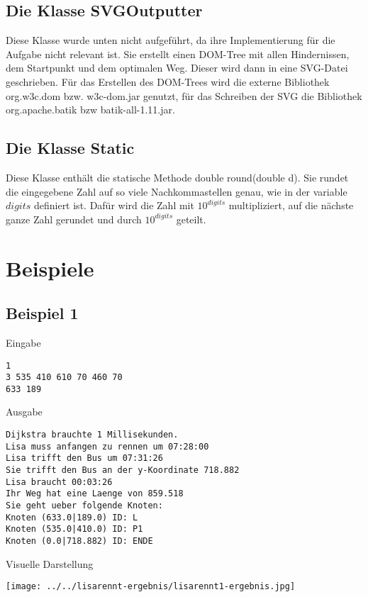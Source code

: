 \documentclass[a4paper,10pt,ngerman]{scrartcl}
\begin{document}
\subsection{Die Klasse SVGOutputter}
Diese Klasse wurde unten nicht aufgeführt, da ihre Implementierung für die Aufgabe nicht relevant ist. Sie erstellt einen DOM-Tree mit allen Hindernissen, dem Startpunkt und dem optimalen Weg. Dieser wird dann in eine SVG-Datei geschrieben. Für das Erstellen des DOM-Trees wird die externe Bibliothek org.w3c.dom bzw. w3c-dom.jar genutzt, für das Schreiben der SVG die Bibliothek org.apache.batik bzw batik-all-1.11.jar.

\subsection{Die Klasse Static}
Diese Klasse enthält die statische Methode double round(double d). Sie rundet die eingegebene Zahl auf so viele Nachkommastellen genau, wie in der variable $digits$ definiert ist. Dafür wird die Zahl mit $10^{digits}$ multipliziert, auf die nächste ganze Zahl gerundet und durch $10^{digits}$ geteilt.
\section{Beispiele}
\lstset{language=none}

\subsection{Beispiel 1}
Eingabe
\begin{lstlisting}
1
3 535 410 610 70 460 70
633 189
\end{lstlisting}
Ausgabe
\begin{lstlisting}
Dijkstra brauchte 1 Millisekunden.
Lisa muss anfangen zu rennen um 07:28:00
Lisa trifft den Bus um 07:31:26
Sie trifft den Bus an der y-Koordinate 718.882
Lisa braucht 00:03:26
Ihr Weg hat eine Laenge von 859.518
Sie geht ueber folgende Knoten:
Knoten (633.0|189.0) ID: L
Knoten (535.0|410.0) ID: P1
Knoten (0.0|718.882) ID: ENDE
\end{lstlisting}
Visuelle Darstellung
\begin{center}
\texttt{[image: ../../lisarennt-ergebnis/lisarennt1-ergebnis.jpg]} 
\end{center}
\end{document}
